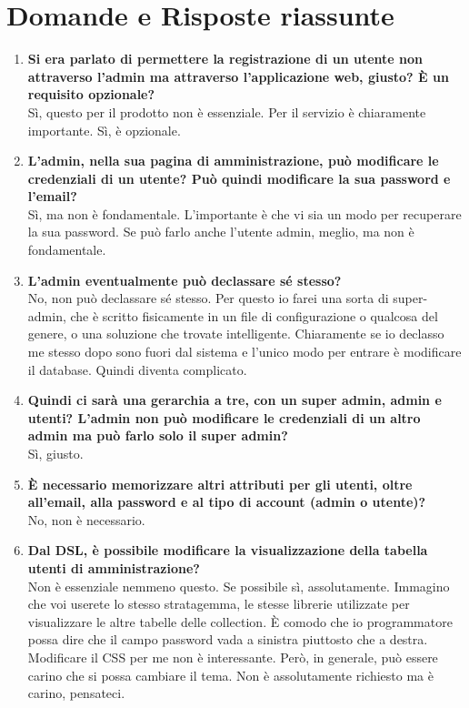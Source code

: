 \section{Domande e Risposte riassunte}
	\begin{enumerate} 
		\item
		{\bfseries Si era parlato di permettere la registrazione di un utente non attraverso l'admin ma attraverso l'applicazione web, giusto? È un requisito opzionale?} \\
		Sì, questo per il prodotto non è essenziale. Per il servizio è chiaramente importante. Sì, è opzionale.
		
		\item
		{\bfseries L'admin, nella sua pagina di amministrazione, può modificare le credenziali di un utente? Può quindi modificare la sua password e l'email?} \\
		Sì, ma non è fondamentale. L'importante è che vi sia un modo per recuperare la sua password. Se può farlo anche l'utente admin, meglio, ma non è fondamentale.
		
		\item
		{\bfseries L'admin eventualmente può declassare sé stesso?} \\
		No, non può declassare sé stesso. Per questo io farei una sorta di super-admin, che è scritto fisicamente in un file di configurazione o qualcosa del genere, o una soluzione che trovate intelligente. Chiaramente se io declasso me stesso dopo sono fuori dal sistema e l'unico modo per entrare è modificare il database. Quindi diventa complicato.
		
		\item
		{\bfseries Quindi ci sarà una gerarchia a tre, con un super admin, admin e utenti? L'admin non può modificare le credenziali di un altro admin ma può farlo solo il super admin?} \\
		Sì, giusto.
		
		\item
		{\bfseries È necessario memorizzare altri attributi per gli utenti, oltre all'email, alla password e al tipo di account (admin o utente)?} \\
		No, non è necessario.
		
		\item
		{\bfseries Dal DSL, è possibile modificare la visualizzazione della tabella utenti di amministrazione?} \\
		Non è essenziale nemmeno questo. Se possibile sì, assolutamente. Immagino che voi userete lo stesso stratagemma, le stesse librerie utilizzate per visualizzare le altre tabelle delle collection.
		È comodo che io programmatore possa dire che il campo password vada a sinistra piuttosto che a destra. Modificare il CSS per me non è interessante. Però, in generale, può essere carino che si possa cambiare il tema. Non è assolutamente richiesto ma è carino, pensateci.
		

\end{enumerate}
